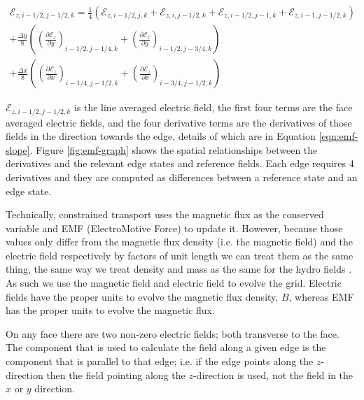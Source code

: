 \begin{equation}
    \label{eqn:emf-edge}
    \begin{aligned}
        \mathcal{E}_{z, i-1/2, j-1/2, k} = \frac{1}{4} \left(
              \mathcal{E}_{z, i-1/2, j, k}
            + \mathcal{E}_{z, i, j-1/2, k}
            + \mathcal{E}_{z, i-1/2, j-1, k}
            + \mathcal{E}_{z, i-1, j-1/2, k}\right) \\
        + \frac{\Delta y}{8} \left( \left( \frac{\partial \mathcal{E}_z }{\partial y} \right)_{i-1/2, j-1/4, k} + \left(  \frac{\partial \mathcal{E}_z }{\partial y} \right)_{i-1/2, j-3/4, k} \right) \\
        + \frac{\Delta x}{8} \left( \left( \frac{\partial \mathcal{E}_z }{\partial x} \right)_{i-1/4, j-1/2, k} + \left(  \frac{\partial \mathcal{E}_z }{\partial x} \right)_{i-3/4, j-1/2, k} \right)
    \end{aligned}
\end{equation}

$\mathcal{E}_{z, i-1/2, j-1/2, k}$ is the line averaged electric field, the first four terms are the face averaged electric fields, and the four derivative terms are the derivatives of those fields in the direction towards the edge, details of which are in Equation \ref{eqn:emf-slope}. Figure \ref{fig:emf-graph} shows the spatial relationships between the derivatives and the relevant edge states and reference fields. Each edge requires 4 derivatives and they are computed as differences between a reference state and an edge state.

Technically, constrained transport uses the magnetic flux as the conserved variable and EMF (ElectroMotive Force) to update it. However, because those values only differ from the magnetic flux density (i.e. the magnetic field) and the electric field respectively by factors of unit length we can treat them as the same thing, the same way we treat density and mass as the same for the hydro fields \citep{stone_athena_2008}. As such we use the magnetic field and electric field to evolve the grid. Electric fields have the proper units to evolve the magnetic flux density, $ B $, whereas EMF has the proper units to evolve the magnetic flux.

On any face there are two non-zero electric fields; both transverse to the face. The component that is used to calculate the field along a given edge is the component that is parallel to that edge; i.e. if the edge points along the $ z $-direction then the field pointing along the $ z $-direction is used, not the field in the $ x $ or $ y $ direction.

